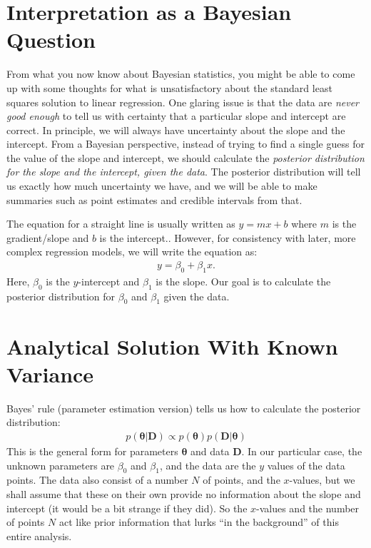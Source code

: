 \section{Interpretation as a Bayesian Question}
From what you now know about Bayesian statistics, you might be able to come up
with some thoughts for what is unsatisfactory about the standard least squares
solution to linear regression. One glaring issue is that the data are {\it never
good enough} to tell us with certainty that a particular slope and intercept
are correct. In principle, we will always have uncertainty about the slope and
the intercept. From a Bayesian perspective, instead of trying to find a single
guess for the value of the slope and intercept, we should calculate the
{\it posterior distribution for the slope and the intercept, given the data}.
The posterior distribution will tell us exactly how much uncertainty we have,
and we will be able to make summaries such as point estimates and credible
intervals from that.

The equation for a straight line is usually written as $y = mx + b$ where $m$
is the gradient/slope and $b$ is the intercept.. However,
for consistency with later, more complex regression models, we will write the
equation as:
\begin{eqnarray}
y = \beta_0 + \beta_1 x.
\end{eqnarray}
Here, $\beta_0$ is the $y$-intercept and $\beta_1$ is the slope. Our goal is
to calculate the posterior distribution for $\beta_0$ and $\beta_1$ given the
data.

\section{Analytical Solution With Known Variance}
Bayes' rule (parameter estimation version) tells us how to calculate the
posterior distribution:
\begin{eqnarray}
p(\boldsymbol{\theta}|\boldsymbol{D}) \propto p(\boldsymbol{\theta})p(\boldsymbol{D}|\boldsymbol{\theta})
\end{eqnarray}
This is the general form for parameters $\boldsymbol{\theta}$ and data
$\boldsymbol{D}$. In our particular case, the
unknown parameters are $\beta_0$ and $\beta_1$, and the data are the
$y$ values of the data points. The data also consist of a number $N$ of points,
and the $x$-values,
but we shall assume that these on their own provide no information about the
slope and intercept (it would be a bit strange if they did). So the $x$-values
and the number of points $N$ act like prior information that lurks ``in the
background'' of this entire analysis.

